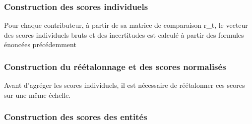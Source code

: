 \subsubsection{Construction des scores individuels}

Pour chaque contributeur, à partir de sa matrice de comparaison r_t, le vecteur des scores individuels bruts et des incertitudes est calculé à partir des formules énoncées précédemment

\subsubsection{Construction du réétalonnage et des scores normalisés}

Avant d'agréger les scores individuels, il est nécessaire de réétalonner ces scores sur une même échelle.

\subsubsection{Construction des scores des entités}

\pagebreak

